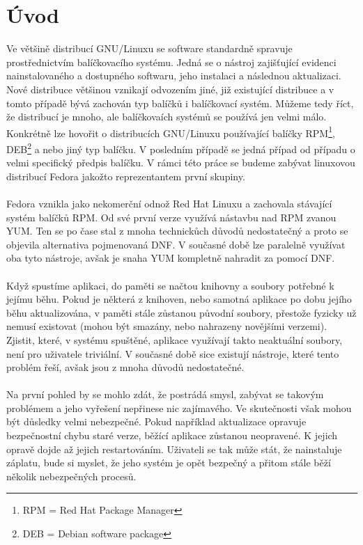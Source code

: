 \documentclass[
  field=inf,
  biblatex,
  glossaries,
  index
]{kidiplom}
\begin{document}
\section{Úvod}
	Ve většině distribucí GNU/Linuxu se software standardně spravuje prostřednictvím balíčkovacího systému. Jedná se o nástroj zajišťující evidenci nainstalovaného a dostupného softwaru, jeho instalaci a následnou aktualizaci. Nové distribuce většinou vznikají odvozením jiné, již existující distribuce a v tomto případě bývá zachován typ balíčků i balíčkovací systém. Můžeme tedy říct, že distribucí je mnoho, ale balíčkovaích systémů se používá jen velmi málo. Konkrétně lze hovořit o distribucích GNU/Linuxu používající balíčky RPM\footnote{RPM = Red Hat Package Manager}, DEB\footnote{DEB = Debian software package} a nebo jiný typ balíčku. V posledním případě se jedná případ od případu o velmi specifický předpis balíčku. V rámci této práce se budeme zabývat linuxovou distribucí Fedora jakožto reprezentantem první skupiny.
	\\
	\\
	Fedora vznikla jako nekomerční odnož Red Hat Linuxu a zachovala stávající systém balíčků RPM\@. Od své první verze využívá nástavbu nad RPM zvanou YUM\@. Ten se po čase stal z mnoha technickůch důvodů nedostatečný a proto se objevila alternativa pojmenovaná DNF\@. V současné době lze paralelně využívat oba tyto nástroje, avšak je snaha YUM kompletně nahradit za pomocí DNF\@.
	\\
	\\
	Když spustíme aplikaci, do paměti se načtou knihovny a soubory potřebné k jejímu běhu. Pokud je některá z knihoven, nebo samotná aplikace po dobu jejího běhu aktualizována, v paměti stále zůstanou původní soubory, přestože fyzicky už nemusí existovat (mohou být smazány, nebo nahrazeny novějšími verzemi).
	\\
	Zjistit, které, v systému spuštěné, aplikace využívají takto neaktuální soubory, není pro uživatele triviální. V současné době sice existují nástroje, které tento problém řeší, avšak jsou z mnoha důvodů nedostatečné.
	\\
	\\
	Na první pohled by se mohlo zdát, že postrádá smysl, zabývat se takovým problémem a jeho vyřešení nepřinese nic zajímavého. Ve skutečnosti však mohou být důsledky velmi nebezpečné. Pokud například aktualizace opravuje bezpečnostní chybu staré verze, běžící aplikace zůstanou neopravené. K jejich opravě dojde až jejich restartováním. Uživateli se tak může stát, že nainstaluje záplatu, bude si myslet, že jeho systém je opět bezpečný a přitom stále běží několik nebezpečných procesů.
\end{document}
